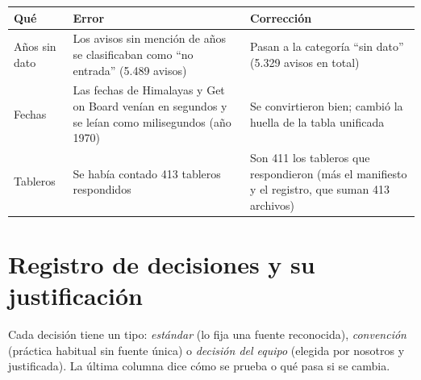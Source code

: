 \documentclass[11pt,a4paper]{article}
\begin{document}
\begin{table}[H]
\centering\small
\begin{tabularx}{\textwidth}{L{3.4cm} X X}
\toprule
{}\textbf{Qué} & \textbf{Error} & \textbf{Corrección}\\
\midrule
Años sin dato & Los avisos sin mención de años se clasificaban como ``no entrada'' (5.489 avisos) & Pasan a la categoría ``sin dato'' (5.329 avisos en total)\\
Fechas & Las fechas de Himalayas y Get on Board venían en segundos y se leían como milisegundos (año 1970) & Se convirtieron bien; cambió la huella de la tabla unificada\\
Tableros & Se había contado 413 tableros respondidos & Son 411 los tableros que respondieron (más el manifiesto y el registro, que suman 413 archivos)\\
\bottomrule
\end{tabularx}
\end{table}

\section{Registro de decisiones y su justificación}
Cada decisión tiene un tipo: \emph{estándar} (lo fija una fuente reconocida), \emph{convención} (práctica habitual sin fuente única) o \emph{decisión del equipo} (elegida por nosotros y justificada). La última columna dice cómo se prueba o qué pasa si se cambia.
\end{document}
